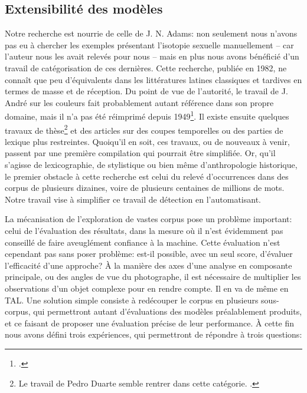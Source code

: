 \subsection{Extensibilité des modèles}

Notre recherche est nourrie de celle de J. N. Adams: non seulement nous n'avons pas eu à chercher les exemples présentant l'isotopie sexuelle manuellement -- car l'auteur nous les avait relevés pour nous -- mais en plus nous avons bénéficié d'un travail de catégorisation de ces dernières. Cette recherche, publiée en 1982, ne connaît que peu d'équivalents dans les littératures latines classiques et tardives en termes de masse et de réception. Du point de vue de l'autorité, le travail de J. André sur les couleurs fait probablement autant référence dans son propre domaine, mais il n'a pas été réimprimé depuis 1949\footcite{andre1949etude}. Il existe ensuite quelques travaux de thèse\footnote{Le travail de Pedro Duarte semble rentrer dans cette catégorie. \textcite{duarte_vocabulaire_2010}.} et des articles sur des coupes temporelles ou des parties de lexique plus restreintes. Quoiqu'il en soit, ces travaux, ou de nouveaux à venir, passent par une première compilation qui pourrait être simplifiée. Or, qu'il s'agisse de lexicographie, de stylistique ou bien même d'anthropologie historique, le premier obstacle à cette recherche est celui du relevé d'occurrences dans des corpus de plusieurs dizaines, voire de plusieurs centaines de millions de mots. Notre travail vise à simplifier ce travail de détection en l'automatisant.

La mécanisation de l'exploration de vastes corpus pose un problème important: celui de l'évaluation des résultats, dans la mesure où il n'est évidemment pas conseillé de faire aveuglément confiance à la machine. Cette évaluation n'est cependant pas sans poser problème: est-il possible, avec un seul score, d'évaluer l'efficacité d'une approche? À la manière des axes d'une analyse en composante principale, ou des angles de vue du photographe, il est nécessaire de multiplier les observations d'un objet complexe pour en rendre compte. Il en va de même en TAL. Une solution simple consiste à redécouper le corpus en plusieurs sous-corpus, qui permettront autant d'évaluations des modèles préalablement produits, et ce faisant de proposer une évaluation précise de leur performance. À cette fin nous avons défini trois expériences, qui permettront de répondre à trois questions:

